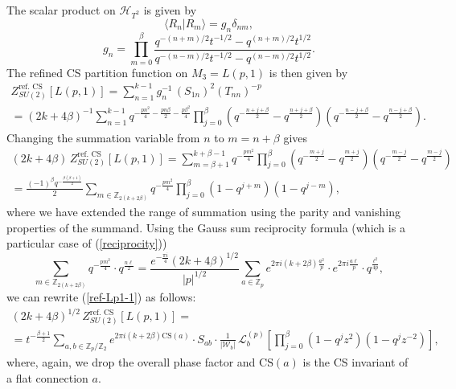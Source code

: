 \documentclass[hyper,letterpaper]{JHEP3}
\newcommand{\Z}{{\mathbb Z}}
\def\CH{{\mathcal H}}
\def\CL{{\mathcal L}}
\def\CW{{\mathcal W}}
\begin{document}
The scalar product on $\CH_{T^2}$ is given by
\begin{equation}
	\langle R_n|R_m\rangle = g_n \delta_{nm},
\end{equation}
\begin{equation}
	g_n=\prod_{m=0}^\beta\frac{q^{-(n+m)/2}t^{-1/2}-q^{(n+m)/2}t^{1/2}}{q^{-(n-m)/2}t^{-1/2}-q^{(n-m)/2}t^{1/2}}.
\end{equation}
The refined CS partition function on $M_3=L(p,1)$ is then given by
\begin{multline}
	Z_{SU(2)}^\text{ref. CS}[L(p,1)]=\sum_{n=1}^{k-1} g^{-1}_n\,(S_{1n})^2(T_{nn})^{-p}\\
	=(2k+4\beta)^{-1}
	\sum_{n=1}^{k-1}q^{-\frac{pn^2}{4}-\frac{pn\beta}{2}-\frac{p\beta^2}{4}}
	\prod_{j=0}^\beta (q^{-\frac{n+j+\beta}{2}}-q^{\frac{n+j+\beta}{2}})
	(q^{-\frac{n-j+\beta}{2}}-q^{\frac{n-j+\beta}{2}}).
\end{multline}
Changing the summation variable from $n$ to $m=n+\beta$ gives
\begin{multline}
	(2k+4\beta)\,Z_{SU(2)}^\text{ref. CS}[L(p,1)]=
	\sum_{m=\beta+1}^{k+\beta-1}q^{-\frac{pm^2}{4}}
	\prod_{j=0}^\beta (q^{-\frac{m+j}{2}}-q^{\frac{m+j}{2}})
	(q^{-\frac{m-j}{2}}-q^{\frac{m-j}{2}})\\
	=\frac{(-1)^\beta q^{-\frac{\beta(\beta+1)}{2}} }{2}
	\sum_{m\in \Z_{2(k+2\beta)}}q^{-\frac{pm^2}{4}}\prod_{j=0}^\beta (1-q^{j+m})(1-q^{j-m}),
	\label{ref-Lp1-1}
\end{multline}
where we have extended the range of summation using the parity and vanishing properties of the summand.
Using the Gauss sum reciprocity formula (which is a particular case of (\ref{reciprocity}))
\begin{equation}
	\sum_{m\in \Z_{2(k+2\beta)}}q^{-\frac{pm^2}{4}}\cdot q^{\frac{n\ell}{2}}=
	\frac{e^{-\frac{\pi i}{4}}(2k+4\beta)^{1/2}}{|p|^{1/2}}
	\sum_{a\in \Z_p} e^{2\pi i (k+2\beta)\frac{a^2}{p}}\cdot
	e^{2\pi i \frac{a\ell}{p}}\cdot
	q^{\frac{\ell^2}{4p}},
\end{equation}
we can rewrite (\ref{ref-Lp1-1}) as follows:
\begin{multline}
	(2k+4\beta)^{1/2}\,Z_{SU(2)}^\text{ref. CS}[L(p,1)]=\\
	=t^{-\frac{\beta+1}{2}}\sum_{a,b\in \Z_p /\Z_2} e^{2\pi i (k+2\beta)\text{CS}(a)}\cdot
	S_{ab}\cdot \frac{1}{|\CW_b|}\,\CL_{b}^{(p)}\left[\prod_{j=0}^\beta (1-q^{j}z^2)(1-q^{j}z^{-2})\right],
\end{multline}
where, again, we drop the overall phase factor
and $\text{CS}(a)$ is the CS invariant of a flat connection $a$.
\end{document}
